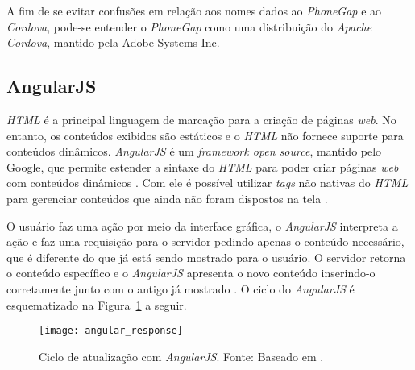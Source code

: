 A fim de se evitar confusões em relação aos nomes dados ao \textit{PhoneGap} e ao \textit{Cordova}, pode-se entender o \textit{PhoneGap} 
como uma distribuição do \textit{Apache Cordova}, mantido pela Adobe Systems Inc. 



\subsection{AngularJS} \label{subsection:angularjs}

\textit{HTML} é a principal linguagem de marcação para a criação de páginas \textit{web}. No entanto, os conteúdos 
exibidos são estáticos e o \textit{HTML} não fornece suporte para conteúdos dinâmicos.
\textit{AngularJS} é um \textit{framework open source}, mantido pelo Google, que permite estender a sintaxe do 
\textit{HTML} para poder criar páginas \textit{web} com conteúdos dinâmicos \cite{bezerra_desenvolvimento_2016}. Com ele é possível utilizar \textit{tags} 
não nativas do \textit{HTML} para gerenciar conteúdos que ainda não 
foram dispostos na tela \cite{google_angularjs_2016}.

O usuário faz uma ação por meio da interface gráfica, 
o \textit{AngularJS} interpreta a ação e faz uma requisição para o servidor pedindo apenas o conteúdo necessário, que é 
diferente do que já está sendo mostrado para o usuário. 
O servidor retorna o conteúdo específico e o \textit{AngularJS} apresenta o novo conteúdo inserindo-o corretamente junto 
com o antigo já mostrado \cite{ursino_angularjs:_2015}. O ciclo do \textit{AngularJS} é esquematizado na Figura~\ref{fig:angular_response} a seguir.

\begin{figure}[h]
  \centering
    \texttt{[image: angular\_response]}
    \caption[Ciclo de atualização com \textit{AngularJS}]{ Ciclo de atualização com \textit{AngularJS}. Fonte: Baseado em \cite{ursino_angularjs:_2015}.}
	\label{fig:angular_response}
\end{figure}

